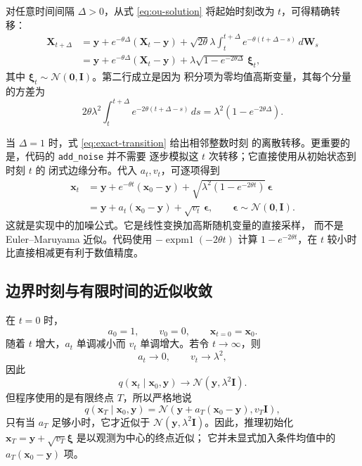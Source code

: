 \documentclass[UTF8,a4paper,12pt]{ctexart}
\begin{document}
对任意时间间隔 \(\Delta>0\)，从式 \eqref{eq:ou-solution}
将起始时刻改为 \(t\)，可得精确转移：
\begin{align}
  \bm{X}_{t+\Delta}
  &=\bm{y}+e^{-\theta\Delta}(\bm{X}_t-\bm{y})
    +\sqrt{2\theta}\lambda
       \int_t^{t+\Delta}
         e^{-\theta(t+\Delta-s)}\,d\bm{W}_s
  \\
  &=\bm{y}+e^{-\theta\Delta}(\bm{X}_t-\bm{y})
    +\lambda\sqrt{1-e^{-2\theta\Delta}}\,\bm{\xi}_t,
  \label{eq:exact-transition}
\end{align}
其中 \(\bm{\xi}_t\sim\mathcal{N}(\bm{0},\bm{I})\)。第二行成立是因为
积分项为零均值高斯变量，其每个分量的方差为
\[
  2\theta\lambda^2\int_t^{t+\Delta}
      e^{-2\theta(t+\Delta-s)}\,ds
  =\lambda^2(1-e^{-2\theta\Delta}).
\]

当 \(\Delta=1\) 时，式 \eqref{eq:exact-transition} 给出相邻整数时刻
的离散转移。更重要的是，代码的 \texttt{add\_noise} 并不需要
逐步模拟这 \(t\) 次转移；它直接使用从初始状态到时刻 \(t\) 的
闭式边缘分布。代入 \(a_t,v_t\)，可逐项得到
\begin{align}
  \bm{x}_t
  &=\bm{y}+e^{-\theta t}(\bm{x}_0-\bm{y})
     +\sqrt{\lambda^2(1-e^{-2\theta t})}\,\bm{\epsilon}
  \\
  &=\bm{y}+a_t(\bm{x}_0-\bm{y})
     +\sqrt{v_t}\,\bm{\epsilon},
  \qquad \bm{\epsilon}\sim\mathcal{N}(\bm{0},\bm{I}).
  \label{eq:forward-code}
\end{align}
这就是实现中的加噪公式。它是线性变换加高斯随机变量的直接采样，
而不是 Euler--Maruyama 近似。代码使用
\(-\operatorname{expm1}(-2\theta t)\) 计算
\(1-e^{-2\theta t}\)，在 \(t\) 较小时比直接相减更有利于数值精度。

\subsection{边界时刻与有限时间的近似收敛}

在 \(t=0\) 时，
\[
  a_0=1,\qquad v_0=0,\qquad \bm{x}_{t=0}=\bm{x}_0.
\]
随着 \(t\) 增大，\(a_t\) 单调减小而 \(v_t\) 单调增大。若令
\(t\to\infty\)，则
\[
  a_t\to 0,\qquad v_t\to\lambda^2,
\]
因此
\[
  q(\bm{x}_t\mid\bm{x}_0,\bm{y})
  \longrightarrow
  \mathcal{N}(\bm{y},\lambda^2\bm{I}).
\]
但程序使用的是有限终点 \(T\)，所以严格地说
\[
  q(\bm{x}_T\mid\bm{x}_0,\bm{y})
  =
  \mathcal{N}\!\left(
    \bm{y}+a_T(\bm{x}_0-\bm{y}),v_T\bm{I}
  \right),
\]
只有当 \(a_T\) 足够小时，它才近似于
\(\mathcal{N}(\bm{y},\lambda^2\bm{I})\)。因此，推理初始化
\(\bm{x}_T=\bm{y}+\sqrt{v_T}\bm{\xi}\) 是以观测为中心的终点近似；
它并未显式加入条件均值中的 \(a_T(\bm{x}_0-\bm{y})\) 项。
\end{document}
